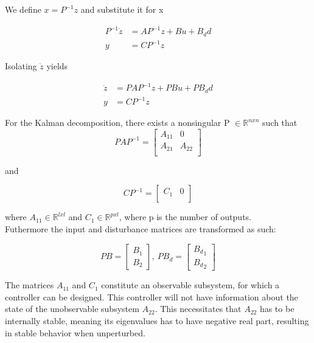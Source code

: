 We define $x = P^{-1}z$ and substitute it for x

\begin{equation}
	\begin{split}
		P^{-1}\dot{z} & = AP^{-1}z + Bu + B_dd \\
		y & = CP^{-1}z
	\end{split}
\end{equation}

Isolating $\dot{z}$ yields

\begin{equation}
	\begin{split}
		\dot{z} & = PAP^{-1}z + PBu + PB_dd \\
		y & = CP^{-1}z
	\end{split}
\end{equation}

For the Kalman decomposition, there exists a nonsingular P  $\in \mathbb{R} ^{n x n}$ such that
\begin{equation}
	PAP^{-1} = \begin{bmatrix}
		A_{11}       & 0 \\
		A_{21}       & A_{22} \\
	\end{bmatrix}
\end{equation}

and

\begin{equation}
	CP^{-1} = \begin{bmatrix}
		C_{1}       & 0 \\
	\end{bmatrix}
\end{equation}

where $A_{11} \in \mathbb{R} ^{l x l}$ and $C_{1} \in \mathbb{R} ^{p x l}$, where p is the number of outputs.\\Futhermore the input and disturbance matrices are transformed as such:

\begin{equation}
	PB = \begin{bmatrix}
		B_1 \\
		B_2
	\end{bmatrix}, \
	PB_d = \begin{bmatrix}
		{B_d}_1 \\
		{B_d}_2
	\end{bmatrix}
\end{equation}


The matrices $A_{11}$ and $C_{1}$ constitute an observable subsystem, for which a controller can be designed. This controller will not have information about the state of the unobservable subsystem $A_{22}$. This necessitates that $A_{22}$ has to be internally stable, meaning its eigenvalues has to have negative real part, resulting in stable behavior when unperturbed.

